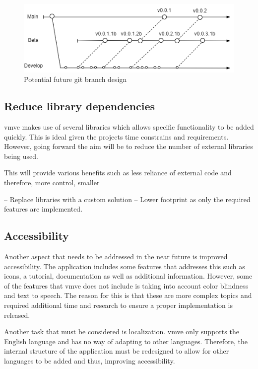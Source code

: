 \documentclass[11pt]{article}
\begin{document}
\begin{figure}[h!]
  \centering
  \includegraphics[width=\textwidth]{images/future_branch_design.png}
  \caption{Potential future git branch design}
  \label{fig:futurebrancharch}
\end{figure}

\subsection{Reduce library dependencies}
\gls{vmve} makes use of several libraries which allows specific functionality to be
added quickly. This is ideal given the projects time constrains and
requirements. However, going forward the aim will be to reduce the number of
external libraries being used.

This will provide various benefits such as less reliance of external code and
therefore, more control, smaller 


-- Replace libraries with a custom solution --
Lower footprint as only the required features are implemented.

\subsection{Accessibility}
Another aspect that needs to be addressed in the near future is improved
accessibility. The application includes some features that addresses this such
as icons, a tutorial, documentation as well as additional information. However,
some of the features that \gls{vmve} does not include is taking into account
color blindness and text to speech. The reason for this is that these are more
complex topics and required additional time and research to ensure a proper 
implementation is released.

Another task that must be considered is localization. \gls{vmve} only supports
the English language and has no way of adapting to other languages. Therefore,
the internal structure of the application must be redesigned to allow for
other languages to be added and thus, improving accessibility.
\end{document}
